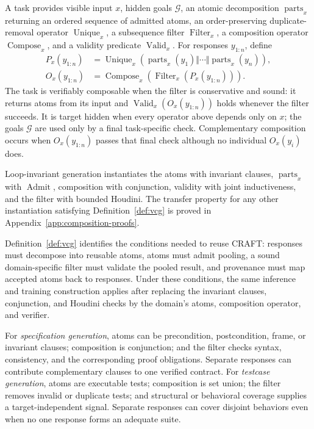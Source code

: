 \begin{definition}
\label{def:vcg}
A task provides visible input \(x\), hidden goals \(\mathcal G\), an atomic
decomposition \(\operatorname{parts}_x\) returning an ordered sequence of
admitted atoms, an order-preserving duplicate-removal operator
\(\operatorname{Unique}_x\), a subsequence filter \(\operatorname{Filter}_x\), a
composition operator \(\operatorname{Compose}_x\), and a validity predicate
\(\operatorname{Valid}_x\).  For responses \(y_{1:n}\), define
\begin{align}
  P_x(y_{1:n})
    &=\operatorname{Unique}_x\!\left(
      \operatorname{parts}_x(y_1)\Vert\cdots\Vert
      \operatorname{parts}_x(y_n)\right),\\
  O_x(y_{1:n})
    &=\operatorname{Compose}_x\!\left(
      \operatorname{Filter}_x(P_x(y_{1:n}))\right).
  \label{eq:formal-general-pipeline}
\end{align}
The task is verifiably composable when the filter is conservative and sound:
it returns atoms from its input and
\(\operatorname{Valid}_x(O_x(y_{1:n}))\) holds whenever the filter succeeds.
It is target hidden when every operator above depends only on \(x\); the goals
\(\mathcal G\) are used only by a final task-specific check.  Complementary
composition occurs when \(O_x(y_{1:n})\) passes that final check although no
individual \(O_x(y_i)\) does.
\end{definition}

Loop-invariant generation instantiates the atoms with invariant clauses,
\(\operatorname{parts}_x\) with \(\operatorname{Admit}\), composition with
conjunction, validity with joint inductiveness, and the filter with bounded
Houdini.  The transfer property for any other
instantiation satisfying Definition~\ref{def:vcg} is proved in
Appendix~\ref{app:composition-proofs}.

Definition~\ref{def:vcg} identifies the conditions needed to reuse CRAFT:
responses must decompose into reusable atoms, atoms must admit pooling, a
sound domain-specific filter must validate the pooled result, and provenance
must map accepted atoms back to responses.  Under these conditions, the same
inference and training construction applies after replacing the invariant
clauses, conjunction, and Houdini checks by the domain's atoms, composition
operator, and verifier.

For \emph{specification generation}, atoms can be precondition,
postcondition, frame, or invariant clauses; composition is conjunction; and
the filter checks syntax, consistency, and the corresponding proof
obligations.  Separate responses can contribute complementary clauses to one
verified contract.  For \emph{testcase generation}, atoms are executable
tests; composition is set union; the filter removes invalid or duplicate
tests; and structural or behavioral coverage supplies a target-independent
signal.  Separate responses can cover disjoint behaviors even when no one
response forms an adequate suite.

